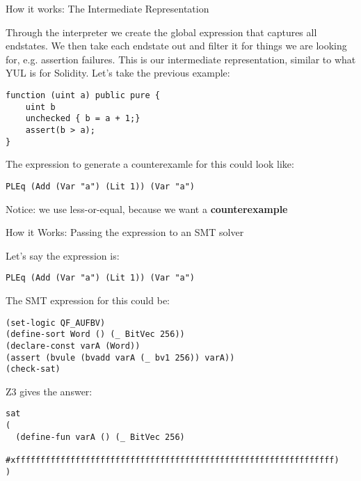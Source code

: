 \documentclass{beamer}
\begin{document}
\begin{frame}[fragile=singleslide]{How it works: The Intermediate Representation}
\small

Through the interpreter we create the global expression that captures all endstates. We then take each endstate out and filter it for things we are looking for, e.g. assertion failures. This is our intermediate representation, similar to what YUL is for Solidity. Let's take the previous example:


\begin{Verbatim}[frame=single, framerule=0.2mm,framesep=2mm,fontsize=\small]
function (uint a) public pure {
	uint b
	unchecked { b = a + 1;}
	assert(b > a);
}
\end{Verbatim}

The expression to generate a counterexamle for this could look like:

\begin{Verbatim}[frame=single, framerule=0.2mm, framesep=2mm,fontsize=\small]
PLEq (Add (Var "a") (Lit 1)) (Var "a")
\end{Verbatim}

Notice: we use less-or-equal, because we want a \textbf{counterexample}
\end{frame}

\begin{frame}[fragile=singleslide]{How it Works: Passing the expression to an SMT solver}

Let's say the expression is:

\begin{Verbatim}[frame=single, framerule=0.2mm, framesep=2mm,fontsize=\footnotesize]
PLEq (Add (Var "a") (Lit 1)) (Var "a")
\end{Verbatim}
\bigskip

The SMT expression for this could be:

\begin{Verbatim}[frame=single, framerule=0.2mm, framesep=2mm,fontsize=\footnotesize]
(set-logic QF_AUFBV)
(define-sort Word () (_ BitVec 256))
(declare-const varA (Word))
(assert (bvule (bvadd varA (_ bv1 256)) varA))
(check-sat)
\end{Verbatim}

Z3 gives the answer:

\begin{Verbatim}[frame=single, framerule=0.2mm, framesep=2mm,fontsize=\footnotesize]
sat
(
  (define-fun varA () (_ BitVec 256)
    #xffffffffffffffffffffffffffffffffffffffffffffffffffffffffffffffff)
)
\end{Verbatim}
\end{frame}
\end{document}
